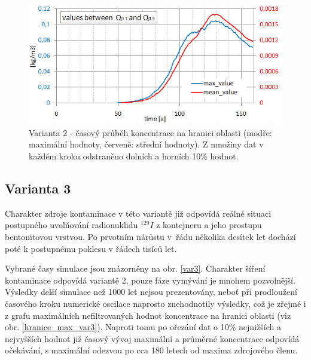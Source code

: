 \documentclass[11pt,a4paper]{article}
\newcommand{\obraz}[1]{(viz obr. \ref{#1})}
\begin{document}
\begin{onehalfspacing}
\begin{figure}[H]
\centering
\includegraphics{graphics/obr_ralek/var2/hranice_max_orez.PNG}
\caption{Varianta 2 - časový průběh koncentrace na hranici oblasti (modře: maximální hodnoty, červeně: střední hodnoty). Z množiny dat v každém kroku odstraněno dolních a horních 10\% hodnot.}
\label{hranice_max_var2_orez}
\end{figure}

\subsection{Varianta 3}
Charakter zdroje kontaminace v této variantě již odpovídá reálné situaci postupného uvolňování radionuklidu $^{129}I$ z kontejneru a jeho prostupu bentonitovou vrstvou. Po prvotním nárůstu v~řádu několika desítek let dochází poté k postupnému poklesu v řádech tisíců let.

Vybrané časy simulace jsou znázorněny na obr. \ref{var3}. Charakter šíření kontaminace odpovídá variantě 2, pouze fáze vymývání je mnohem pozvolnější. Výsledky delší simulace než 1000 let nejsou prezentovány, neboť při prodloužení časového kroku numerické oscilace naprosto znehodnotily výsledky, což je zřejmé i z grafu maximálních nefiltrovaných hodnot koncentrace na hranici oblasti \obraz{hranice_max_var3}. Naproti tomu po ořezání dat o 10\% nejnižších a nejvyšších hodnot již časový vývoj maximální a průměrné koncentrace odpovídá očekávání, s maximální odezvou po cca 180 letech od maxima zdrojového členu.


\end{onehalfspacing}
\end{document}
